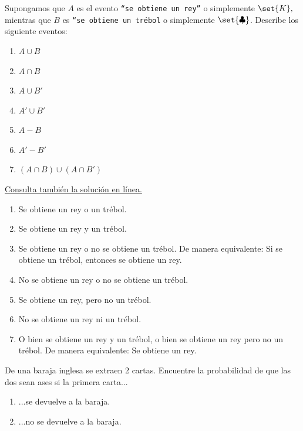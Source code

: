 \begin{problema}
	\label{solved:1.2}
	Supongamos que $A$ es el evento \texttt{``se obtiene un rey''} o simplemente $\set{K},$ mientras que $B$ es \texttt{``se obtiene un tr\'ebol} o simplemente $\set{\clubsuit}$. Describe los siguiente eventos: 
	\begin{enumerate}
		\item $A\cup B$ 
		\item $A\cap B$ 
		\item $A \cup B'$ 
		\item $A' \cup B'$ 
		\item $A - B$ 
		\item $A'-B'$ 
		\item $(A\cap B) \cup (A\cap B')$
	\end{enumerate}
\end{problema}

\begin{solucion}
	\href{https://youtu.be/S9VFhMWVyu4}{Consulta también la solución en línea.}
	\begin{enumerate}
		\item Se obtiene un rey o un trébol.
		\item Se obtiene un rey y un trébol.
		\item Se obtiene un rey o no se obtiene un trébol. De manera equivalente: Si se obtiene un trébol, entonces se obtiene un rey. 
		\item No se obtiene un rey o no se obtiene un trébol.
		\item Se obtiene un rey, pero no un trébol. 
		\item No se obtiene un rey ni un trébol.
		\item O bien se obtiene un rey y un trébol, o bien se obtiene un rey pero no un trébol. De manera equivalente: Se obtiene un rey.		
	\end{enumerate}
\end{solucion}



\begin{problema}
	\label{solved:est.6.5}
	De una baraja inglesa se extraen 2 cartas. Encuentre la probabilidad de que las dos sean ases si la primera carta...
	\begin{enumerate}
		\item ...se devuelve a la baraja.
		\item ...no se devuelve a la baraja.
	\end{enumerate}
	
\end{problema}

